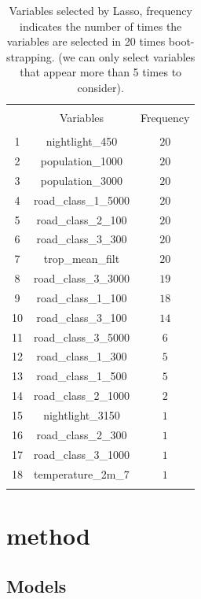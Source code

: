\documentclass{article}
\begin{document}
  \begin{table}[!htbp] \centering 
  \caption{Variables selected by Lasso, frequency indicates the number of times the variables are selected in 20 times boot-strapping. (we can only select variables that appear more than 5 times to consider).} 
  \label{lassoselect} 
\begin{tabular}{@{\extracolsep{5pt}} ccc} 
\\[-1.8ex]\hline 
\hline \\[-1.8ex] 
 & Variables & Frequency \\ 
\hline \\[-1.8ex] 
 1 & nightlight\_450 & $20$ \\ 
2 & population\_1000 & $20$ \\ 
3 & population\_3000 & $20$ \\ 
4 & road\_class\_1\_5000 & $20$ \\ 
5 & road\_class\_2\_100 & $20$ \\ 
6 & road\_class\_3\_300 & $20$ \\ 
7 & trop\_mean\_filt & $20$ \\ 
8 & road\_class\_3\_3000 & $19$ \\ 
9 & road\_class\_1\_100 & $18$ \\ 
10 & road\_class\_3\_100 & $14$ \\ 
11 & road\_class\_3\_5000 & $6$ \\ 
12 & road\_class\_1\_300 & $5$ \\ 
13 & road\_class\_1\_500 & $5$ \\ 
14 & road\_class\_2\_1000 & $2$ \\ 
15 & nightlight\_3150 & $1$ \\ 
16 & road\_class\_2\_300 & $1$ \\ 
17 & road\_class\_3\_1000 & $1$ \\ 
18 & temperature\_2m\_7 & $1$ \\  
 
\hline \\[-1.8ex] 
\end{tabular} 
\end{table} 

\section {method}

\subsection{Models}
\end{document}
